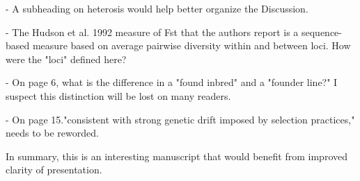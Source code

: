 \documentclass[onecolumn,oneside,letterpaper]{article}
\begin{document}
- A subheading on heterosis would help better organize the Discussion.

- The Hudson et al. 1992 measure of Fst that the authors report is a sequence-based measure based on 
average pairwise diversity within and between loci. How were the "loci" defined here?

- On page 6, what is the difference in a "found inbred" and a "founder line?" I suspect this distinction will 
be lost on many readers.

- On page 15."consistent with strong genetic drift imposed by selection practices," needs to be reworded.

In summary, this is an interesting manuscript that would benefit from improved clarity of presentation.



\end{document}
